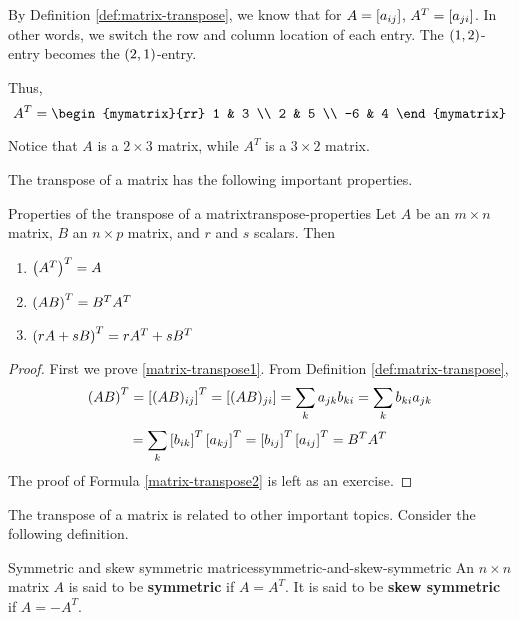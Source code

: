 \begin{solution}
By Definition \ref{def:matrix-transpose}, we know that for $A = \left[a_{ij} \right]$, 
$A^T = \left[a_{ji} \right]$. In other words, we switch the row and column
location of each entry. The $\left(1, 2 \right)$-entry becomes the $\left(2,1 \right)$-entry.

Thus, 
\begin{equation*}
A^T = 
 \begin{mymatrix}{rr}
1 & 3 \\
2 & 5 \\
-6 & 4
\end{mymatrix} 
\end{equation*}

Notice that $A$ is a $2 \times 3$ matrix, while $A^T$ is a $3 \times 2$ matrix. 
\end{solution}

The transpose of a matrix has the following important properties.

\begin{lemma}{Properties of the transpose of a matrix}{transpose-properties}
Let $A$ be an $m\times n$ matrix, $B$ an $n\times p$ matrix, and $r$ and $s$ scalars. Then
\begin{enumerate}
\item
$\left(A^{T}\right)^{T} = A$
\item
$\left(AB\right) ^{T}=B^{T}A^{T} $ \label{matrix-transpose1}
\item
$\left(rA+ sB\right) ^{T}=rA^{T}+ sB^{T}$  \label{matrix-transpose2}
\end{enumerate}
\end{lemma}

\begin{proof}
First we prove \ref{matrix-transpose1}. From Definition \ref{def:matrix-transpose},
\begin{equation*}
\left(AB\right)^{T} = \left[(AB) _{ij} \right] ^{T}=\left[(AB)_{ji} \right]=\sum_{k}a_{jk}b_{ki}= \sum_{k}b_{ki}a_{jk} 
\end{equation*}
\begin{equation*}
= \sum_{k}\left[b_{ik}\right]^{T}\left[
a_{kj}\right]^{T}=\left[b_{ij}\right] ^{T} \left[a_{ij}\right]^{T} = B^{T}A^{T} 
\end{equation*}
The proof of Formula \ref{matrix-transpose2} is left as an exercise. 
\end{proof}

The transpose of a matrix is related to other important topics. Consider the following definition.  

\begin{definition}{Symmetric and skew symmetric matrices}{symmetric-and-skew-symmetric}
An $n\times n$ matrix $A$ is said to be
\textbf{symmetric} if $A=A^{T}.$ It is said to be
\textbf{skew symmetric} if $A=-A^{T}.$
\end{definition}

